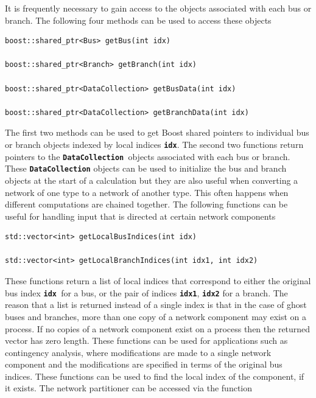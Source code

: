 \documentclass[12pt]{report} %
\begin{document}
It is frequently necessary to gain access to the objects associated with each bus or branch. The following four methods can be used to access these objects

{
\color{red}
\begin{Verbatim}[fontseries=b]
boost::shared_ptr<Bus> getBus(int idx)

boost::shared_ptr<Branch> getBranch(int idx)

boost::shared_ptr<DataCollection> getBusData(int idx)

boost::shared_ptr<DataCollection> getBranchData(int idx)
\end{Verbatim}
}

The first two methods can be used to get Boost shared pointers to individual bus or branch objects indexed by local indices \texttt{\textbf{idx}}. The second two functions return pointers to the \texttt{\textbf{DataCollection }}objects associated with each bus or branch. These \texttt{\textbf{DataCollection}} objects can be used to initialize the bus and branch objects at the start of a calculation but they are also useful when converting a network of one type to a network of another type. This often happens when different computations are chained together.
The following functions can be useful for handling input that is directed at certain network components

{
\color{red}
\begin{Verbatim}[fontseries=b]
std::vector<int> getLocalBusIndices(int idx)

std::vector<int> getLocalBranchIndices(int idx1, int idx2)
\end{Verbatim}
}

These functions return a list of local indices that correspond to either the original bus index \texttt{\textbf{idx }}for a bus, or the pair of indices \texttt{\textbf{idx1}}, \texttt{\textbf{idx2}} for a branch. The reason that a list is returned instead of a single index is that in the case of ghost buses and branches, more than one copy of a network component may exist on a process. If no copies of a network component exist on a process then the returned vector has zero length. These functions can be used for applications such as contingency analysis, where modifications are made to a single network component and the modifications are specified in terms of the original bus indices. These functions can be used to find the local index of the component, if it exists. 
The network partitioner can be accessed via the function
\end{document}
